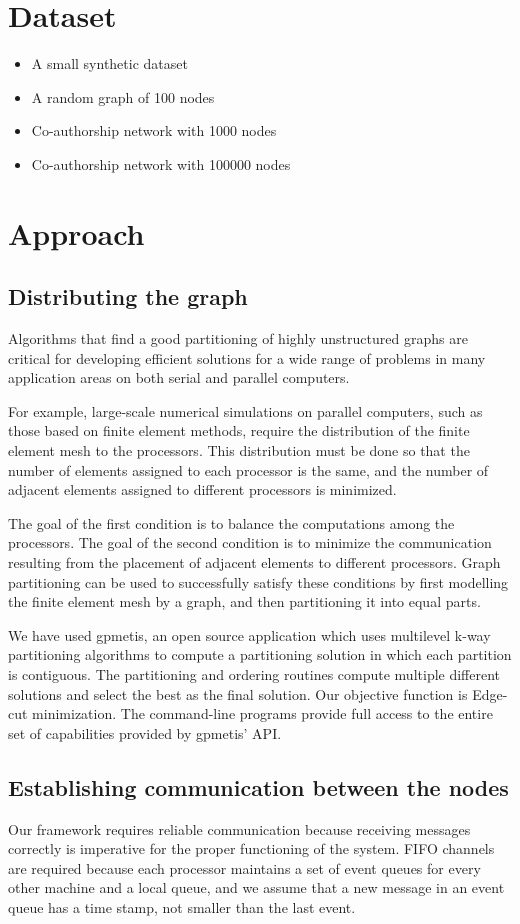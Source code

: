 \documentclass[12pt,a4paper]{article}
\begin{document}
\section{Dataset}
	\begin{itemize}[nolistsep]
		\item A small synthetic dataset
		\item A random graph of 100 nodes
		\item Co-authorship network with 1000 nodes
		\item Co-authorship network with 100000 nodes
	\end{itemize}

\section{Approach}
	\subsection{Distributing the graph}
Algorithms that find a good partitioning of highly unstructured graphs are critical for developing efficient solutions for a wide range of problems in many application areas on both serial and parallel computers.

For example, large-scale numerical simulations on parallel computers, such as those based on finite element methods, require the distribution of the finite element mesh to the processors. This distribution must be done so that the number of elements assigned to each processor is the same, and the number of adjacent elements assigned to different processors is minimized.

The goal of the first condition is to balance the computations among the processors. The goal of the second condition is to minimize the communication resulting from the placement of adjacent elements to different processors. Graph partitioning can be used to successfully satisfy these conditions by first modelling the finite element mesh by a graph, and then partitioning it into equal parts.

We have used gpmetis, an open source application which uses multilevel k-way partitioning algorithms to compute a partitioning solution in which each partition is contiguous. The partitioning and ordering routines compute multiple different solutions and select the best as the final solution. Our objective function is Edge-cut minimization. The command-line programs provide full access to the entire set of capabilities provided by gpmetis' API.
	\subsection{Establishing communication between the nodes}
Our framework requires reliable communication because receiving messages correctly is imperative for the proper functioning of the system. FIFO channels are required because each processor maintains a set of event queues for every other machine and a local queue, and we assume that a new message in an event queue has a time stamp, not smaller than the last event.
\end{document}
